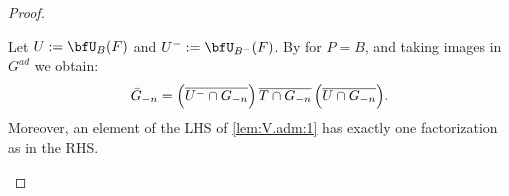 \documentclass[12pt,a4paper]{amsart}%
\newcommand{\RamiD}[1]{{{#1}}}
\begin{document}
\begin{proof}
\begin{enumerate}[Step 1.]
    \RamiD{Let $U:=\bfU_B(F)$ and $U^-:=\bfU_{B^-}(F)$.}
    By  for $P=B$, 
    and 
    taking images in $G^{ad}$ \RamiD{we obtain:}    \begin{equation}\label{lem:V.adm:1}
    \RamiD{
    \bar G_{-n}=\Bigl(\overline{U^{-} \cap G_{-n} }\Bigr)\,\overline{T\cap G_{-n}}\,\Bigl(\overline{U \cap G_{-n} }\Bigr).}
    \end{equation}
    \RamiD{Moreover, an element of the LHS of \eqref{lem:V.adm:1} has exactly one factorization as in the RHS.}


\end{enumerate}
\end{proof}
\end{document}
